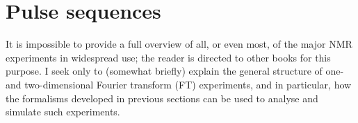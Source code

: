 \section{Pulse sequences}
\label{sec:theory__pulse_sequences}

It is impossible to provide a full overview of all, or even most, of the major NMR experiments in widespread use; the reader is directed to other books for this purpose.
I seek only to (somewhat briefly) explain the general structure of one- and two-dimensional Fourier transform (FT) experiments, and in particular, how the formalisms developed in previous sections can be used to analyse and simulate such experiments.






